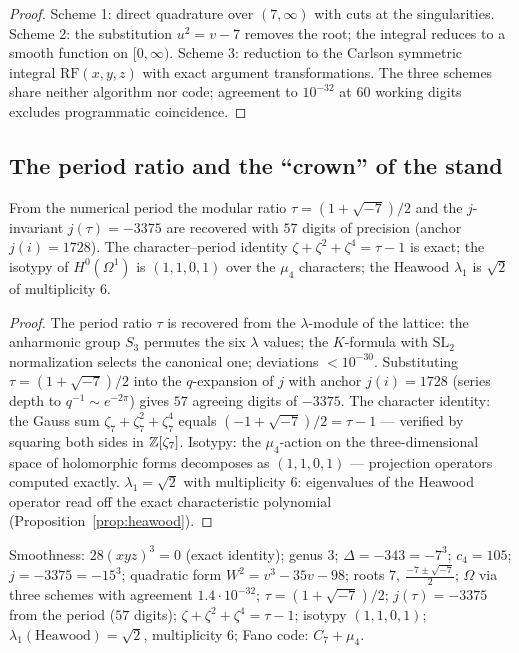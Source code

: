 \begin{proof}
Scheme 1: direct quadrature over $(7,\infty)$ with cuts at the
singularities. Scheme 2: the substitution $u^2=v-7$ removes the
root; the integral reduces to a smooth function on $[0,\infty)$.
Scheme 3: reduction to the Carlson symmetric integral
$\mathrm{RF}(x,y,z)$ with exact argument transformations. The three
schemes share neither algorithm nor code; agreement to $10^{-32}$ at
$60$ working digits excludes programmatic coincidence.
\end{proof}

\subsection{The period ratio and the ``crown'' of the stand}

\begin{theorem}\label{th:klein-j}
From the numerical period the modular ratio $\tau=(1+\sqrt{-7})/2$
and the $j$-invariant $j(\tau)=-3375$ are recovered with $57$ digits
of precision (anchor $j(i)=1728$). The character--period identity
$\zeta+\zeta^2+\zeta^4=\tau-1$ is exact; the isotypy of
$H^0(\Omega^1)$ is $(1,1,0,1)$ over the $\mu_4$ characters; the
Heawood $\lambda_1$ is $\sqrt2$ of multiplicity $6$.
\end{theorem}

\begin{proof}
The period ratio $\tau$ is recovered from the $\lambda$-module of
the lattice: the anharmonic group $S_3$ permutes the six $\lambda$
values; the $K$-formula with $\mathrm{SL}_2$ normalization selects
the canonical one; deviations $<10^{-30}$. Substituting
$\tau=(1+\sqrt{-7})/2$ into the $q$-expansion of $j$ with anchor
$j(i)=1728$ (series depth to $q^{-1}\sim e^{-2\pi}$) gives $57$
agreeing digits of $-3375$. The character identity: the Gauss sum
$\zeta_7+\zeta_7^2+\zeta_7^4$ equals $(-1+\sqrt{-7})/2=\tau-1$ ---
verified by squaring both sides in $\mathbb{Z}[\zeta_7]$. Isotypy: the
$\mu_4$-action on the three-dimensional space of holomorphic forms
decomposes as $(1,1,0,1)$ --- projection operators computed exactly.
$\lambda_1=\sqrt2$ with multiplicity $6$: eigenvalues of the Heawood
operator read off the exact characteristic polynomial
(Proposition~\ref{prop:heawood}).
\end{proof}

\begin{databox}
Smoothness: $28(xyz)^3=0$ (exact identity); genus $3$;
$\Delta=-343=-7^3$; $c_4=105$; $j=-3375=-15^3$; quadratic form
$W^2=v^3-35v-98$; roots $7,\ \tfrac{-7\pm\sqrt{-7}}2$;
$\Omega$ via three schemes with agreement $1.4\cdot10^{-32}$;
$\tau=(1+\sqrt{-7})/2$; $j(\tau)=-3375$ from the period ($57$
digits); $\zeta+\zeta^2+\zeta^4=\tau-1$; isotypy $(1,1,0,1)$;
$\lambda_1(\text{Heawood})=\sqrt2$, multiplicity $6$;
Fano code: $C_7+\mu_4$.
\end{databox}

